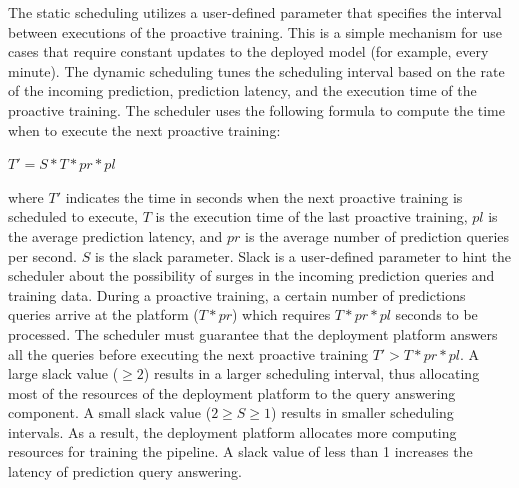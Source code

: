 The static scheduling utilizes a user-defined parameter that specifies the interval between executions of the proactive training.
This is a simple mechanism for use cases that require constant updates to the deployed model (for example, every minute).
The dynamic scheduling tunes the scheduling interval based on the rate of the incoming prediction, prediction latency, and the execution time of the proactive training.
The scheduler uses the following formula to compute the time when to execute the next proactive training:
\begin{center}
$T' = S * T * pr * pl$
\end{center}
where $T'$ indicates the time in seconds when the next proactive training is scheduled to execute, $T$ is the execution time of the last proactive training, $pl$ is the average prediction latency, and $pr$ is the average number of prediction queries per second.
$S$ is the slack parameter.
Slack is a user-defined parameter to hint the scheduler about the possibility of surges in the incoming prediction queries and training data.
During a proactive training, a certain number of predictions queries arrive at the platform ($T * pr$) which requires $T * pr * pl$ seconds to be processed.
The scheduler must guarantee that the deployment platform answers all the queries before executing the next proactive training $T' > T * pr * pl$.
A large slack value ($\geq2$) results in a larger scheduling interval, thus allocating most of the resources of the deployment platform to the query answering component.
A small slack value ($2 \geq S \geq 1$) results in smaller scheduling intervals.
As a result, the deployment platform allocates more computing resources for training the pipeline.
A slack value of less than 1 increases the latency of prediction query answering.

